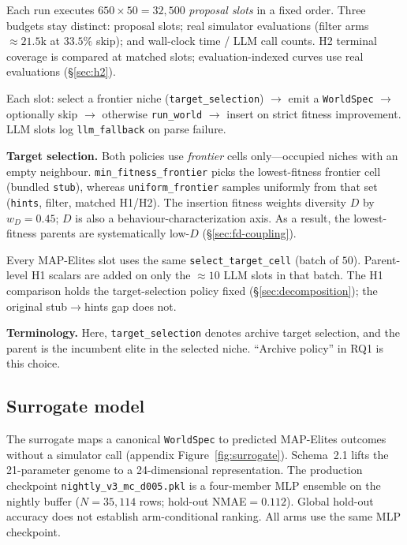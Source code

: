 \documentclass[preprint,12pt]{elsarticle}
\begin{document}
Each run executes $650 \times 50 = 32{,}500$ \emph{proposal slots} in a fixed order. Three budgets stay distinct: proposal slots; real simulator evaluations (filter arms ${\approx}21.5$k at $33.5\%$ skip); and wall-clock time / LLM call counts. H2 terminal coverage is compared at matched slots; evaluation-indexed curves use real evaluations (\S\ref{sec:h2}).

Each slot: select a frontier niche (\texttt{target\_selection}) $\rightarrow$ emit a \texttt{WorldSpec} $\rightarrow$ optionally skip $\rightarrow$ otherwise \texttt{run\_world} $\rightarrow$ insert on strict fitness improvement. LLM slots log \texttt{llm\_fallback} on parse failure.

\textbf{Target selection.} Both policies use \emph{frontier} cells only---occupied niches with an empty neighbour. \texttt{min\_fitness\_frontier} picks the lowest-fitness frontier cell (bundled \texttt{stub}), whereas \texttt{uniform\_frontier} samples uniformly from that set (\texttt{hints}, filter, matched H1/H2). The insertion fitness weights diversity $D$ by $w_D{=}0.45$; $D$ is also a behaviour-characterization axis. As a result, the lowest-fitness parents are systematically low-$D$ (\S\ref{sec:fd-coupling}).

Every MAP-Elites slot uses the same \texttt{select\_target\_cell} (batch of $50$). Parent-level H1 scalars are added on only the ${\approx}10$ LLM slots in that batch. The H1 comparison holds the target-selection policy fixed (\S\ref{sec:decomposition}); the original stub$\rightarrow$hints gap does not.

\textbf{Terminology.} Here, \texttt{target\_selection} denotes archive target selection, and the parent is the incumbent elite in the selected niche. ``Archive policy'' in RQ1 is this choice.

\subsection{Surrogate model}
\label{sec:surrogate-method}

The surrogate maps a canonical \texttt{WorldSpec} to predicted MAP-Elites outcomes without a simulator call (appendix Figure~\ref{fig:surrogate}). Schema~2.1 lifts the 21-parameter genome to a 24-dimensional representation. The production checkpoint \texttt{nightly\_v3\_mc\_d005.pkl} is a four-member MLP ensemble on the nightly buffer ($N{=}35{,}114$ rows; hold-out NMAE${=}0.112$). Global hold-out accuracy does not establish arm-conditional ranking. All arms use the same MLP checkpoint.
\end{document}
